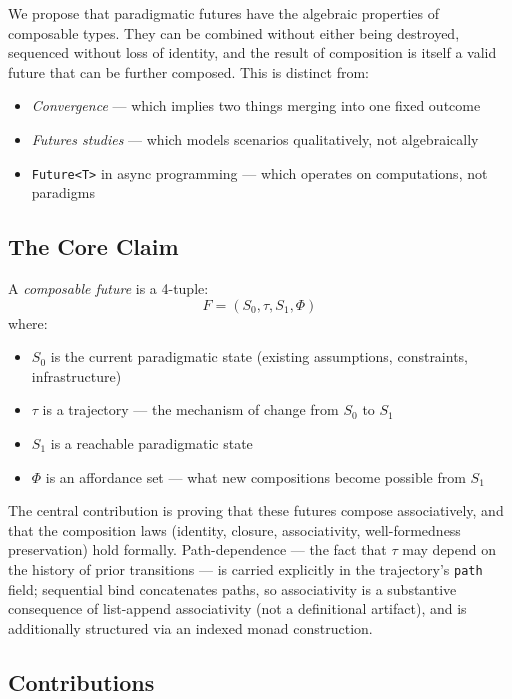 \documentclass[11pt,a4paper]{article}
\begin{document}
We propose that paradigmatic futures have the algebraic properties of composable types. They can be combined without either being destroyed, sequenced without loss of identity, and the result of composition is itself a valid future that can be further composed. This is distinct from:
\begin{itemize}
\item \emph{Convergence} — which implies two things merging into one fixed outcome
\item \emph{Futures studies} — which models scenarios qualitatively, not algebraically
\item \texttt{Future<T>} in async programming — which operates on computations, not paradigms
\end{itemize}

\subsection{The Core Claim}

A \emph{composable future} is a 4-tuple:
\[
F = (S_0, \tau, S_1, \Phi)
\]
where:
\begin{itemize}
\item $S_0$ is the current paradigmatic state (existing assumptions, constraints, infrastructure)
\item $\tau$ is a trajectory — the mechanism of change from $S_0$ to $S_1$
\item $S_1$ is a reachable paradigmatic state
\item $\Phi$ is an affordance set — what new compositions become possible from $S_1$
\end{itemize}

The central contribution is proving that these futures compose associatively, and that the composition laws (identity, closure, associativity, well-formedness preservation) hold formally. Path-dependence --- the fact that $\tau$ may depend on the history of prior transitions --- is carried explicitly in the trajectory's \texttt{path} field; sequential bind concatenates paths, so associativity is a substantive consequence of list-append associativity (not a definitional artifact), and is additionally structured via an indexed monad construction.

\subsection{Contributions}
\end{document}
